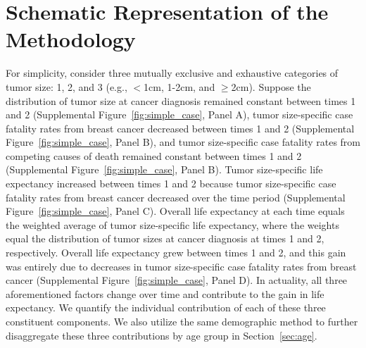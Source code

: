 \documentclass[11pt,letterpaper]{article}
\theoremstyle{plain}
\begin{document}
\section{Schematic Representation of the Methodology}
For simplicity, consider three mutually exclusive and exhaustive
categories of tumor size: 1, 2, and 3 (e.g., $<$1cm, 1-2cm, and
$\geq$2cm).  Suppose the distribution of tumor size at cancer
diagnosis remained constant between times 1 and 2 (Supplemental
Figure~\ref{fig:simple_case}, Panel A), tumor size-specific case
fatality rates from breast cancer decreased between times 1 and 2
(Supplemental Figure~\ref{fig:simple_case}, Panel B), and tumor
size-specific case fatality rates from competing causes of death
remained constant between times 1 and 2 (Supplemental
Figure~\ref{fig:simple_case}, Panel B).  Tumor size-specific life
expectancy increased between times 1 and 2 because tumor size-specific
case fatality rates from breast cancer decreased over the time period
(Supplemental Figure~\ref{fig:simple_case}, Panel C).  Overall life
expectancy at each time equals the weighted average of tumor
size-specific life expectancy, where the weights equal the
distribution of tumor sizes at cancer diagnosis at times 1 and 2,
respectively.  Overall life expectancy grew between times 1 and 2, and
this gain was entirely due to decreases in tumor size-specific case
fatality rates from breast cancer (Supplemental
Figure~\ref{fig:simple_case}, Panel D).  In actuality, all three
aforementioned factors change over time and contribute to the gain in
life expectancy.  We quantify the individual contribution of each of
these three constituent components.  We also utilize the same
demographic method to further disaggregate these three contributions
by age group in Section~\ref{sec:age}.
\end{document}
